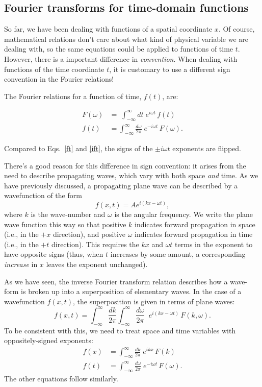 \documentclass[10pt,a4paper]{article}
\begin{document}
\subsection{Fourier transforms for time-domain functions}
\label{fourier-transforms-for-time-domain-functions}

So far, we have been dealing with functions of a spatial coordinate
$x$. Of course, mathematical relations don't care about what kind of
physical variable we are dealing with, so the same equations could be
applied to functions of time $t$. However, there is a important
difference in \emph{convention}. When dealing with functions of the time
coordinate $t$, it is customary to use a different sign convention in
the Fourier relations!

The Fourier relations for a function of time, $f(t)$, are:
\begin{framed}
  \begin{align}
    F(\omega) &= \;\int_{-\infty}^\infty dt\; e^{i\omega t}\, f(t) \\ f(t) &= \int_{-\infty}^\infty \frac{d\omega}{2\pi}\; e^{-i\omega t}\, F(\omega).
  \end{align}
\end{framed}

\noindent
Compared to Eqs.~\eqref{ft} and \eqref{ift}, the signs of the $\pm i
\omega t$ exponents are flipped.

There's a good reason for this difference in sign convention: it
arises from the need to describe propagating waves, which vary with
both space \emph{and} time. As we have previously discussed, a
propagating plane wave can be described by a wavefunction of the form
\begin{equation}
f(x,t) = A e^{i(kx - \omega t)},
\end{equation}
where $k$ is the wave-number and $\omega$ is the angular frequency.
We write the plane wave function this way so that positive $k$
indicates forward propagation in space (i.e., in the $+x$ direction),
and positive $\omega$ indicates forward propagation in time (i.e., in
the $+t$ direction). This requires the $kx$ and $\omega t$ terms
in the exponent to have opposite signs (thus, when $t$ increases by
some amount, a corresponding \emph{increase} in $x$ leaves the
exponent unchanged).

As we have seen, the inverse Fourier transform relation describes how a
wave-form is broken up into a superposition of elementary waves. In the
case of a wavefunction $f(x,t)$, the superposition is given in terms
of plane waves:
\begin{equation}
f(x,t) = \int_{-\infty}^\infty \frac{dk}{2\pi} \int_{-\infty}^\infty \frac{d\omega}{2\pi}\;\; e^{i(kx-\omega t)}\, F(k,\omega).
\end{equation}
To be consistent with this, we need to treat space and time variables
with oppositely-signed exponents:
\begin{align}
  f(x) &= \int_{-\infty}^\infty \frac{dk}{2\pi}\; e^{ikx}\, F(k) \\
  f(t) &= \int_{-\infty}^\infty \frac{d\omega}{2\pi}\; e^{-i\omega t}\, F(\omega).
\end{align}
The other equations follow similarly.
\end{document}
